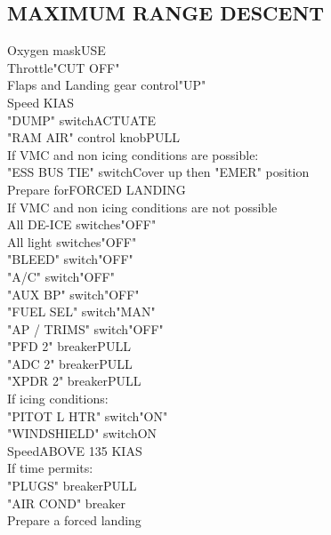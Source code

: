 \documentclass{article}
\begin{document}
\begin{multicols*}{2}
\section*{MAXIMUM RANGE DESCENT}
Oxygen mask\dotfill USE\\
Throttle\dotfill "CUT OFF"\\
Flaps and Landing gear control\dotfill "UP"\\
Speed KIAS\\
"DUMP" switch\dotfill ACTUATE\\
"RAM AIR" control knob\dotfill PULL\\
If VMC and non icing conditions are possible:\\
"ESS BUS TIE" switch\dotfill Cover up then "EMER" position\\
Prepare for\dotfill FORCED LANDING\\
If VMC and non icing conditions are not possible\\
All DE-ICE switches\dotfill "OFF"\\
All light switches\dotfill "OFF"\\
"BLEED" switch\dotfill "OFF"\\
"A/C" switch\dotfill "OFF"\\
"AUX BP" switch\dotfill "OFF"\\
"FUEL SEL" switch\dotfill "MAN"\\
"AP / TRIMS" switch\dotfill "OFF"\\
"PFD 2" breaker\dotfill PULL\\
"ADC 2" breaker\dotfill PULL\\
"XPDR 2" breaker\dotfill PULL\\
If icing conditions:\\
\hspace*{6mm}"PITOT L HTR" switch\dotfill "ON"\\
\hspace*{6mm}"WINDSHIELD" switch\dotfill ON\\
Speed\dotfill ABOVE 135 KIAS\\
If time permits:\\
\hspace*{6mm}"PLUGS" breaker\dotfill PULL\\
\hspace*{6mm}"AIR COND" breaker\\
Prepare a forced landing
\vfill\null

\end{multicols*}
\end{document}
